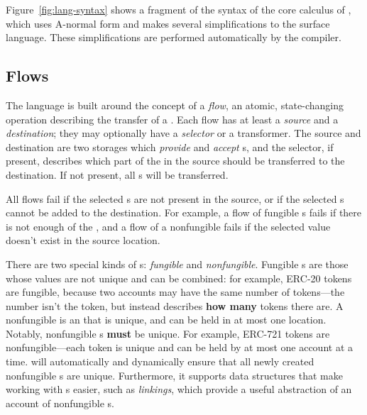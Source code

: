 \documentclass[sigconf]{acmart}
\begin{document}
Figure~\ref{fig:lang-syntax} shows a fragment of the syntax of the core calculus of \langName, which uses A-normal form  and makes several simplifications to the surface \langName language.
These simplifications are performed automatically by the compiler.

\subsection{Flows}
The \langName language is built around the concept of a \emph{flow}, an atomic, state-changing operation describing the transfer of a \assetTxt.
Each flow has at least a \emph{source} and a \emph{destination}; they may optionally have a \emph{selector} or a transformer.
The source and destination are two storages which \emph{provide} and \emph{accept} \assetTxt{}s, and the selector, if present, describes which part of the \assetTxt in the source should be transferred to the destination.
If not present, all \assetTxt{}s will be transferred.

All flows fail if the selected \assetTxt{}s are not present in the source, or if the selected \assetTxt{}s cannot be added to the destination.
For example, a flow of fungible \assetTxt{}s fails if there is not enough of the \assetTxt, and a flow of a nonfungible \assetTxt fails if the selected value doesn't exist in the source location.

There are two special kinds of \assetTxt{}s: \emph{fungible} and \emph{nonfungible}.
Fungible \assetTxt{}s are those whose values are not unique and can be combined: for example, ERC-20 tokens are fungible, because two accounts may have the same number of tokens---the number isn't the token, but instead describes \textbf{how many} tokens there are.
A nonfungible \assetTxt is an \assetTxt that is unique, and can be held in at most one location.
Notably, nonfungible \assetTxt{}s \textbf{must} be unique.
For example, ERC-721  tokens are nonfungible---each token is unique and can be held by at most one account at a time.
\langName will automatically and dynamically ensure that all newly created nonfungible \assetTxt{}s are unique.
Furthermore, it supports data structures that make working with \assetTxt{}s easier, such as \emph{linkings}, which provide a useful abstraction of an account of nonfungible \assetTxt{}s.
\end{document}
